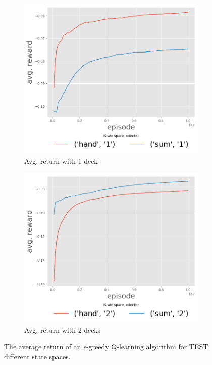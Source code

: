 \begin{figure}[htp]
\centering
 \begin{subfigure}[b]{0.48\textwidth}
  	 \includegraphics[width=\textwidth]{./figures/avgReturnEp_ndeck1.png}
   \caption{Avg. return with 1 deck\label{sfig:3Dfignd6}}
 \end{subfigure}
 \begin{subfigure}[b]{0.48\textwidth}
  	 \includegraphics[width=\textwidth]{./figures/avgReturnEp_ndeck2.png}
   \caption{Avg. return with 2 decks\label{sfig:3Dfignd8}}
 \end{subfigure}
\caption{The average return of an $\epsilon$-greedy Q-learning algorithm for TEST different state spaces. \label{fig:avg_return}}
\end{figure}